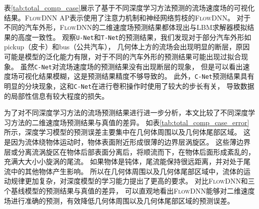 表\ref{tab:total_comp_case}展示了基于不同深度学习方法预测的流场速度场的可视化结果。\textsc{FlowDNN} AP表示使用了注意力机制和神经网络剪枝的\textsc{FlowDNN}。
对于不同的汽车外形，\textsc{FlowDNN}的二维速度场预测结果都体现出与LBM求解器模拟结果的高度一致性。
观察\texttt{U-Net}和\texttt{T-Net}的预测结果，我们发现对于部分汽车外形如pickup（皮卡）和bus（公共汽车），
几何体上方的流场会出现明显的断层，原因可能是模型的泛化能力有限，对于不同的汽车外形的预测结果可能出现过拟合现象。
虽然\texttt{C-Net}对流场速度场的预测结果没有出现断层的现象，
但是可以看出速度场可视化结果模糊，这是预测结果精度不够导致的。
此外，\texttt{C-Net}预测结果具有明显的分块现象，这和\texttt{C-Net}在进行卷积操作时使用了较大的步长有关，
导致数据的局部性信息有较大程度的损失。



为了对不同深度学习方法的流场预测结果进行进一步分析，本文比较了不同深度学习方法的二维速度场预测结果与真值的差异。
如表\ref{tab:total_comp_case_error}所示，深度学习模型的预测误差主要集中在几何体周围以及几何体尾部区域。
这是因为流体绕物体运动时，物体表面附近形成很薄的边界层涡旋区。
这些薄边界层或分离流涡旋区在物体后部表面分离后，将顺流而下，在物体后面形成紊乱的，充满大大小小旋涡的尾流。
如果物体是钝体，尾流能保持很远距离，并对处于尾流中的其他物体产生影响。
所以在几何体周围以及几何体尾部区域中，流体的运动规律更加复杂，对深度模型的学习能力提出了更高的要求。
对比\textsc{FlowDNN}和三个基线模型的预测结果与真值的差异，
可以直观地看出\textsc{FlowDNN}能够对二维速度场进行准确的预测，有效降低几何体周围以及几何体尾部区域的预测误差。




